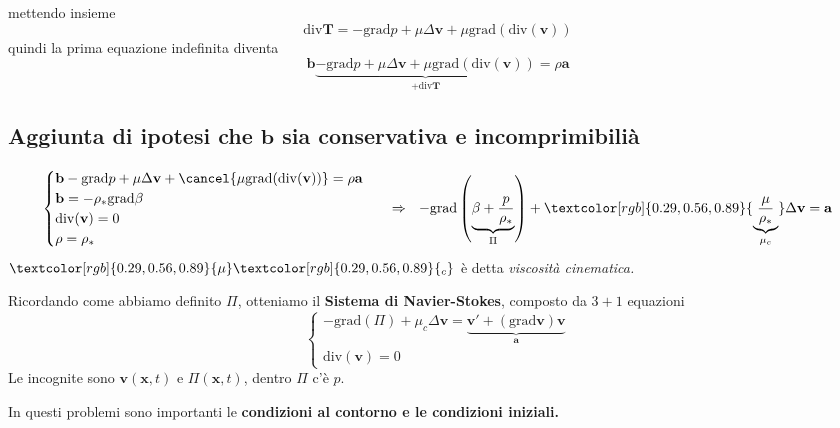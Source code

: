 \documentclass[10pt,a4paper,twoside]{book}
\begin{document}
mettendo insieme
\begin{equation*}
\mathrm{div}\mathbf{T} =-\mathrm{grad} p+\mu \Delta \mathbf{v} +\mu \mathrm{grad}(\mathrm{div}(\mathbf{v}))
\end{equation*}
quindi la prima equazione indefinita diventa
\begin{equation*}
\mathbf{b}\underbrace{-\mathrm{grad} p+\mu \Delta \mathbf{v} +\mu \mathrm{grad}(\mathrm{div}(\mathbf{v}))}_{+\mathrm{div}\mathbf{T}} =\rho \mathbf{a}
\end{equation*}
\subsection{Aggiunta di ipotesi che $\mathbf{b}$ sia conservativa e incomprimibilià}
\begin{equation*}
\begin{cases}
\mathbf{b} -\mathrm{grad} p+\mu \Delta \mathbf{v} +\cancel{\mu \mathrm{grad}(\mathrm{div}(\mathbf{v}))} =\rho \mathbf{a}\\
\mathbf{b} =-\rho _{*}\mathrm{grad} \beta \\
\mathrm{div}(\mathbf{v}) =0\\
\rho =\rho _{*}
\end{cases} \ \ \Rightarrow \ \ -\mathrm{grad}\left(\underbrace{\beta +\frac{p}{\rho _{*}}}_{\Pi }\right) +\textcolor[rgb]{0.29,0.56,0.89}{\underbrace{\frac{\mu }{\rho _{*}}}_{\mu _{c}}} \Delta \mathbf{v} =\mathbf{a}
\end{equation*}
$\textcolor[rgb]{0.29,0.56,0.89}{\mu }\textcolor[rgb]{0.29,0.56,0.89}{_{c}}$ è detta \textit{viscosità cinematica.}

Ricordando come abbiamo definito $\Pi $, otteniamo il \textbf{Sistema di Navier-Stokes}, composto da $3+1$ equazioni
\begin{equation*}
\boxed{\begin{cases}
-\mathrm{grad}( \Pi ) +\mu _{c} \Delta \mathbf{v} =\underbrace{\mathbf{v} '+(\mathrm{grad}\mathbf{v})\mathbf{v}}_{\mathbf{a}}\\
\mathrm{div}(\mathbf{v}) =0
\end{cases}}
\end{equation*}
Le incognite sono $\mathbf{v}(\mathbf{x} ,t)$ e $\Pi (\mathbf{x} ,t)$, dentro $\Pi $ c'è $p$.



In questi problemi sono importanti le \textbf{condizioni al contorno e le condizioni iniziali.}

\end{document}
